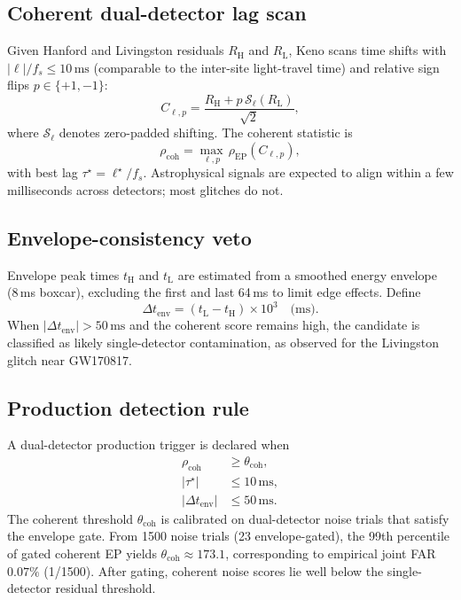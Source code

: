 \documentclass[11pt,a4paper]{article}
\begin{document}
\subsection{Coherent dual-detector lag scan}
Given Hanford and Livingston residuals $R_{\mathrm{H}}$ and $R_{\mathrm{L}}$,
Keno scans time shifts with $|\ell|/f_s \le 10\,\mathrm{ms}$ (comparable to the
inter-site light-travel time) and relative sign flips $p\in\{+1,-1\}$:
\begin{equation}
C_{\ell,p}
  = \frac{R_{\mathrm{H}} + p\,\mathcal{S}_{\ell}(R_{\mathrm{L}})}{\sqrt{2}},
\end{equation}
where $\mathcal{S}_{\ell}$ denotes zero-padded shifting. The coherent statistic
is
\begin{equation}
\rho_{\mathrm{coh}}
  = \max_{\ell,p}\,\rho_{\mathrm{EP}}(C_{\ell,p}),
\end{equation}
with best lag $\tau^{\star}=\ell^{\star}/f_s$. Astrophysical signals are
expected to align within a few milliseconds across detectors; most glitches do
not.

\subsection{Envelope-consistency veto}
Envelope peak times $t_{\mathrm{H}}$ and $t_{\mathrm{L}}$ are estimated from
a smoothed energy envelope (8\,ms boxcar), excluding the first and last
64\,ms to limit edge effects. Define
\begin{equation}
\Delta t_{\mathrm{env}} = (t_{\mathrm{L}}-t_{\mathrm{H}})\times 10^{3}
\quad\text{(ms)}.
\end{equation}
When $|\Delta t_{\mathrm{env}}| > 50\,\mathrm{ms}$ and the coherent score
remains high, the candidate is classified as likely single-detector
contamination, as observed for the Livingston glitch near GW170817.

\subsection{Production detection rule}
A dual-detector production trigger is declared when
\begin{align}
\rho_{\mathrm{coh}} &\ge \theta_{\mathrm{coh}}, \\
|\tau^{\star}| &\le 10\,\mathrm{ms}, \\
|\Delta t_{\mathrm{env}}| &\le 50\,\mathrm{ms}.
\end{align}
The coherent threshold $\theta_{\mathrm{coh}}$ is calibrated on dual-detector
noise trials that satisfy the envelope gate. From 1500 noise trials (23
envelope-gated), the 99th percentile of gated coherent EP yields
$\theta_{\mathrm{coh}}\approx 173.1$, corresponding to empirical joint FAR
$0.07\%$ (1/1500). After gating, coherent noise scores lie well below the
single-detector residual threshold.
\end{document}
